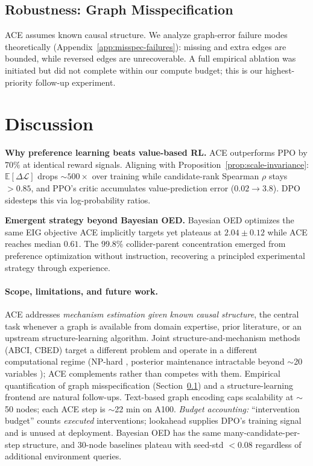 \documentclass{article}
\theoremstyle{plain}
\theoremstyle{definition}
\theoremstyle{remark}
\begin{document}
\subsection{Robustness: Graph Misspecification}
\label{sec:results-misspec}
ACE assumes known causal structure. We analyze graph-error failure modes theoretically (Appendix~\ref{app:misspec-failures}): missing and extra edges are bounded, while reversed edges are unrecoverable. A full empirical ablation was initiated but did not complete within our compute budget; this is our highest-priority follow-up experiment.

\section{Discussion}

\textbf{Why preference learning beats value-based RL.} ACE outperforms PPO by $70\%$ at identical reward signals. Aligning with Proposition~\ref{prop:scale-invariance}: $\mathbb{E}[\Delta\mathcal{L}]$ drops $\sim 500\times$ over training while candidate-rank Spearman $\rho$ stays $>\!0.85$, and PPO's critic accumulates value-prediction error ($0.02 \to 3.8$). DPO sidesteps this via log-probability ratios.

\textbf{Emergent strategy beyond Bayesian OED.} Bayesian OED optimizes the same EIG objective ACE implicitly targets yet plateaus at $2.04\pm0.12$ while ACE reaches median $0.61$. The $99.8\%$ collider-parent concentration emerged from preference optimization without instruction, recovering a principled experimental strategy through experience.

\paragraph{Scope, limitations, and future work.}\label{sec:limitations}
ACE addresses \emph{mechanism estimation given known causal structure}, the central task whenever a graph is available from domain expertise, prior literature, or an upstream structure-learning algorithm. Joint structure-and-mechanism methods (ABCI, CBED) target a different problem and operate in a different computational regime (NP-hard \citep{chickering1996learning}, posterior maintenance intractable beyond $\sim$20 variables \citep{zhou2024sample}); ACE complements rather than competes with them. Empirical quantification of graph misspecification (Section~\ref{sec:results-misspec}) and a structure-learning frontend are natural follow-ups. Text-based graph encoding caps scalability at $\sim$50 nodes; each ACE step is $\sim$22 min on A100. \emph{Budget accounting:} ``intervention budget'' counts \emph{executed} interventions; lookahead supplies DPO's training signal and is unused at deployment. Bayesian OED has the same many-candidate-per-step structure, and 30-node baselines plateau with seed-std $<\!0.08$ regardless of additional environment queries.
\end{document}
